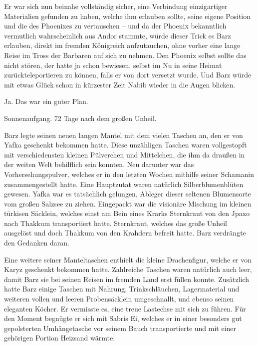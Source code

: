 Er war sich nun beinahe vollständig sicher, eine Verbindung einzigartiger Materialien gefunden zu haben, welche ihm erlauben sollte, seine eigene Position und die des Phoenixes zu vertauschen – und da der Phoenix bekanntlich vermutlich wahrscheinlich aus Andor stammte, würde dieser Trick es Barz erlauben, direkt im fremden Königreich aufzutauchen, ohne vorher eine lange Reise im Tross der Barbaren auf sich zu nehmen. Den Phoenix selbst sollte das nicht stören, der hatte ja schon bewiesen, selbst im Nu in seine Heimat zurückteleportieren zu können, falls er von dort versetzt wurde. Und Barz würde mit etwas Glück schon in kürzester Zeit Nabib wieder in die Augen blicken.

Ja. Das war ein guter Plan.\bigskip







Sonnenaufgang. 72 Tage nach dem großen Unheil.\bigskip



Barz legte seinen neuen langen Mantel mit dem vielen Taschen an, den er von Yafka geschenkt bekommen hatte. Diese unzähligen Taschen waren vollgestopft mit verschiedensten kleinen Pülverchen und Mittelchen, die ihm da draußen in der weiten Welt behilflich sein konnten. Neu darunter war das Vorhersehungspulver, welches er in den letzten Wochen mithilfe seiner Schamanin zusammengestellt hatte. Eine Hauptzutat waren natürlich Silberblumenblüten gewesen. Yafka war es tatsächlich gelungen, Ableger dieser seltenen Blumensorte vom großen Salzsee zu ziehen. Eingepackt war die visionäre Mischung im kleinen türkisen Säcklein, welches einst am Bein eines Krarks Sternkraut von den Jpaxo nach Thakkum transportiert hatte. Sternkraut, welches das große Unheil ausgelöst und doch Thakkum von den Krahdern befreit hatte. Barz verdrängte den Gedanken daran.

Eine weitere seiner Manteltaschen enthielt die kleine Drachenfigur, welche er von Karyz geschenkt bekommen hatte. Zahlreiche Taschen waren natürlich auch leer, damit Barz sie bei seinen Reisen im fremden Land erst füllen konnte. Zusätzlich hatte Barz einige Taschen mit Nahrung, Trinkschläuchen, Lagermaterial und weiteren vollen und leeren Probensäcklein umgeschnallt, und ebenso seinen eleganten Köcher. Er vermisste es, eine treue Lastechse mit sich zu führen. Für den Moment begnügte er sich mit Sabris Ei, welches er in einer besonders gut gepolsterten Umhängetasche vor seinem Bauch transportierte und mit einer gehörigen Portion Heizsand wärmte.


